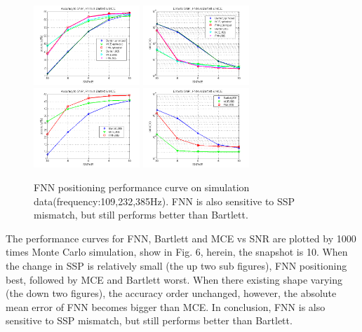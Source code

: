 \begin{figure}
\includegraphics[width=4cm,height=3cm]{figure/Accuracy_to_SNR_FNN_vs_Bartlett_MCE}
\includegraphics[width=4cm,height=3cm]{figure/Error_to_SNR_FNN_vs_Bartlett_MCE}
\includegraphics[width=4cm,height=3cm]{figure/Accuracy_to_SNR_FNN_vs_Bartlett_MCE_i906}
\includegraphics[width=4cm,height=3cm]{figure/Error_to_SNR_FNN_vs_Bartlett_MCE_i906}
\caption{FNN positioning performance curve on simulation data(frequency:109,232,385Hz).
 FNN is also sensitive to SSP mismatch, but still performs better than Bartlett.
}
\end{figure}
The performance curves for FNN, Bartlett and MCE vs SNR are plotted by 1000 times Monte Carlo simulation, show in Fig. 6, herein, the snapshot is 10. When the change in SSP is relatively small (the up two sub figures), FNN positioning best, followed by MCE and Bartlett worst.
When there existing shape varying (the down two figures), the accuracy order unchanged, however, the absolute mean error of FNN becomes bigger than MCE. In conclusion, FNN is also sensitive to SSP mismatch, but still performs better than Bartlett.

